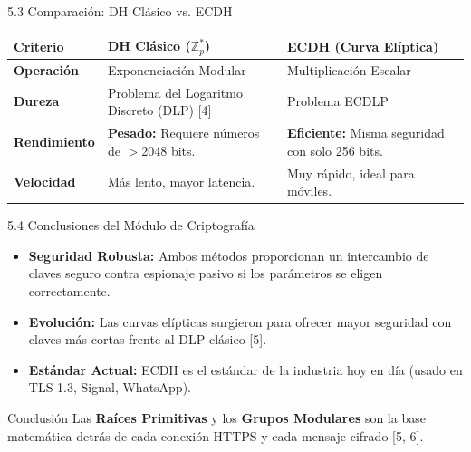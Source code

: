 \documentclass{beamer}
\begin{document}
\begin{frame}{5.3 Comparación: DH Clásico vs. ECDH}
    \vspace{0.1cm}
    \begin{table}[]
        \small
        \centering
        \begin{tabular}{|l|p{3.5cm}|p{3.5cm}|}
        \hline
        \textbf{Criterio} & \textbf{DH Clásico ($\mathbb{Z}_p^*$)} & \textbf{ECDH (Curva Elíptica)} \\ \hline
        \textbf{Operación} & Exponenciación Modular & Multiplicación Escalar \\ \hline
        \textbf{Dureza} & Problema del Logaritmo Discreto (DLP) [4] & Problema ECDLP \\ \hline
        \textbf{Rendimiento} & \textbf{Pesado:} Requiere números de $>$2048 bits. & \textbf{Eficiente:} Misma seguridad con solo 256 bits. \\ \hline
        \textbf{Velocidad} & Más lento, mayor latencia. & Muy rápido, ideal para móviles. \\ \hline
        \end{tabular}
    \end{table}
\end{frame}

\begin{frame}{5.4 Conclusiones del Módulo de Criptografía}
    \begin{itemize}
        \item \textbf{Seguridad Robusta:} Ambos métodos proporcionan un intercambio de claves seguro contra espionaje pasivo si los parámetros se eligen correctamente.
        \item \textbf{Evolución:} Las curvas elípticas surgieron para ofrecer mayor seguridad con claves más cortas frente al DLP clásico [5].
        \item \textbf{Estándar Actual:} ECDH es el estándar de la industria hoy en día (usado en TLS 1.3, Signal, WhatsApp).
    \end{itemize}
    \begin{block}{Conclusión}
        Las \textbf{Raíces Primitivas} y los \textbf{Grupos Modulares} son la base matemática detrás de cada conexión HTTPS y cada mensaje cifrado [5, 6].
    \end{block}
\end{frame}
\end{document}
